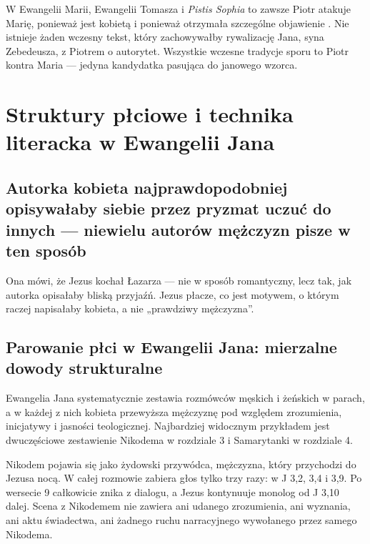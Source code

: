 W Ewangelii Marii, Ewangelii Tomasza i \textit{Pistis Sophia} to zawsze Piotr atakuje Marię, ponieważ jest kobietą i ponieważ otrzymała szczególne objawienie \cite{deboer:magdalene}.
Nie istnieje żaden wczesny tekst, który zachowywałby rywalizację Jana, syna Zebedeusza, z Piotrem o autorytet.
Wszystkie wczesne tradycje sporu to Piotr kontra Maria — jedyna kandydatka pasująca do janowego wzorca.

\section{Struktury płciowe i technika literacka w Ewangelii Jana}\label{sec:gendered-structures-literary}

\subsection{Autorka kobieta najprawdopodobniej opisywałaby siebie przez pryzmat uczuć do innych — niewielu autorów mężczyzn pisze w ten sposób}\label{subsec:finally-a-woman-writer-would-have-been-very-likely-to-describe-themselves-based-on-the-feelings-towards-others-not-many-male-authors-write-like-this.}

Ona mówi, że Jezus kochał Łazarza — nie w sposób romantyczny, lecz tak, jak autorka opisałaby bliską przyjaźń.
Jezus płacze, co jest motywem, o którym raczej napisałaby kobieta, a nie „prawdziwy mężczyzna”.

\subsection{Parowanie płci w Ewangelii Jana: mierzalne dowody strukturalne}\label{subsec:jesus-interactions-towards-nicodemus-are-also-very-feminine-close-and-personal-jesus-is-talking-about-being-born-again.}

Ewangelia Jana systematycznie zestawia rozmówców męskich i żeńskich w parach, a w każdej z nich kobieta przewyższa mężczyznę pod względem zrozumienia, inicjatywy i jasności teologicznej.
Najbardziej widocznym przykładem jest dwuczęściowe zestawienie Nikodema w rozdziale 3 i Samarytanki w rozdziale 4.

Nikodem pojawia się jako żydowski przywódca, mężczyzna, który przychodzi do Jezusa nocą.
W całej rozmowie zabiera głos tylko trzy razy: w J 3,2, 3,4 i 3,9.
Po wersecie 9 całkowicie znika z dialogu, a Jezus kontynuuje monolog od J 3,10 dalej.
Scena z Nikodemem nie zawiera ani udanego zrozumienia, ani wyznania, ani aktu świadectwa, ani żadnego ruchu narracyjnego wywołanego przez samego Nikodema.

